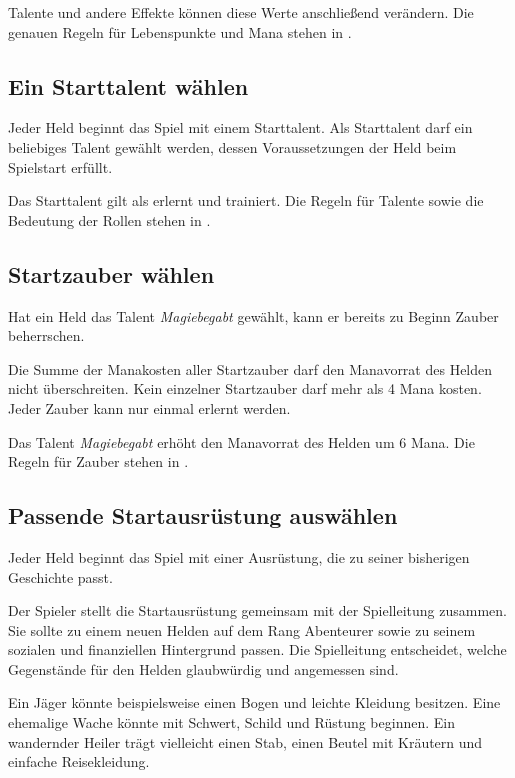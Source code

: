 Talente und andere Effekte können diese Werte anschließend verändern. Die genauen Regeln für Lebenspunkte und Mana stehen in .

\subsection{Ein Starttalent wählen}

Jeder Held beginnt das Spiel mit einem Starttalent. Als Starttalent darf ein beliebiges Talent gewählt werden, dessen Voraussetzungen der Held beim Spielstart erfüllt.

Das Starttalent gilt als erlernt und trainiert. Die Regeln für Talente sowie die Bedeutung der Rollen stehen in .

\subsection{Startzauber wählen}

Hat ein Held das Talent \emph{Magiebegabt} gewählt, kann er bereits zu Beginn Zauber beherrschen.

\begin{kurzregel}[title=Startzauber]
Die Summe der Manakosten aller Startzauber darf den Manavorrat des Helden nicht überschreiten. Kein einzelner Startzauber darf mehr als 4 Mana kosten. Jeder Zauber kann nur einmal erlernt werden.
\end{kurzregel}

Das Talent \emph{Magiebegabt} erhöht den Manavorrat des Helden um 6 Mana. Die Regeln für Zauber stehen in .

\subsection{Passende Startausrüstung auswählen}

Jeder Held beginnt das Spiel mit einer Ausrüstung, die zu seiner bisherigen Geschichte passt.

Der Spieler stellt die Startausrüstung gemeinsam mit der Spielleitung zusammen. Sie sollte zu einem neuen Helden auf dem Rang Abenteurer sowie zu seinem sozialen und finanziellen Hintergrund passen. Die Spielleitung entscheidet, welche Gegenstände für den Helden glaubwürdig und angemessen sind.

Ein Jäger könnte beispielsweise einen Bogen und leichte Kleidung besitzen. Eine ehemalige Wache könnte mit Schwert, Schild und Rüstung beginnen. Ein wandernder Heiler trägt vielleicht einen Stab, einen Beutel mit Kräutern und einfache Reisekleidung.

